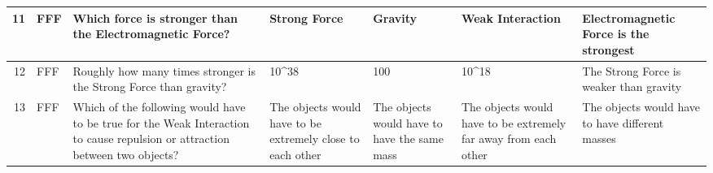 \documentclass[10pt]{article}
\begin{document}
\begin{tiny}
\begin{longtable}{|r|p{0.375in}|p{1.275in}|p{0.75in}|p{0.75in}|p{0.75in}|p{0.75in}|}
    11    &     FFF &                                                                                                                                                                                                                          Which force is stronger than the Electromagnetic Force? &                                                                                                                          Strong Force &                                                                                               Gravity &                                                                                                           Weak Interaction &                                                                                            Electromagnetic Force is the strongest \\\hline
    12    &     FFF &                                                                                                                                                                                                                Roughly how many times stronger is the Strong Force than gravity? &                                                                                                                                 10\textasciicircum 38 &                                                                                                   100 &                                                                                                                      10\textasciicircum 18 &                                                                                           The Strong Force is weaker than gravity \\\hline
    13    &     FFF &                                                                                                                                                      Which of the following would have to be true for the Weak Interaction to cause repulsion or attraction between two objects? &                                                                            The objects would have to be extremely close to each other &                                                          The objects would have to have the same mass &                                                            The objects would have to be extremely far away from each other &                                                                                   The objects would have to have different masses \\\hline

\end{longtable}
\end{tiny}
\end{document}
